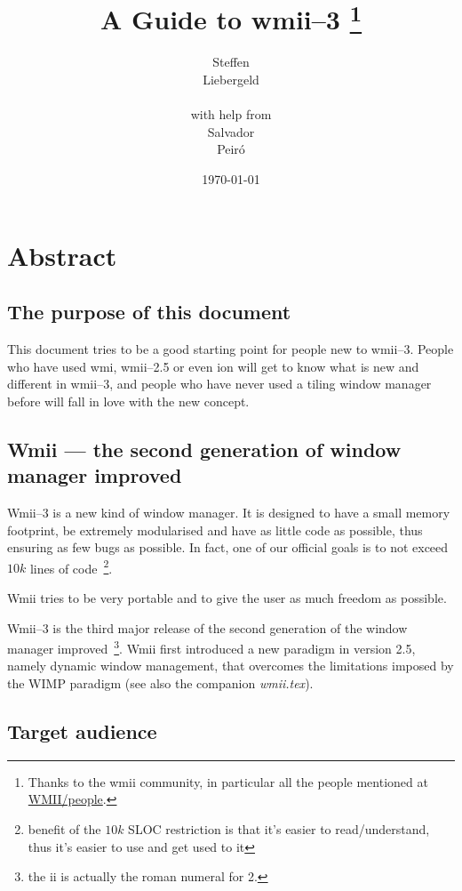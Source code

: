 \documentclass[12pt,a4paper]{article} %
\date{\today}
\author{
Steffen\\Liebergeld \\\\
\small{with help from}\\
Salvador\\Peir\'o
}
\title{A Guide to wmii--3%
\thanks{Thanks to the wmii community, in particular all the 
people mentioned at \href{http://wmii.de/index.php/WMII/People}{WMII/people}.}
}
\begin{document}
\maketitle

\tableofcontents

\newpage

\section{Abstract}

  \subsection{The purpose of this document}

    This document tries to be a good starting point for people new to
    wmii--3.  People who have used wmi, wmii--2.5 or even ion will get
    to know what is new and different in wmii--3, and people who have
    never used a tiling window manager before will fall in love with
    the new concept.
  
  \subsection{Wmii --- the second generation of window manager improved}

    Wmii--3 is a new kind of window manager. It is designed to have a
    small memory footprint, be extremely modularised and have as
    little code as possible, thus ensuring as few bugs as possible. In
    fact, one of our official goals is to not exceed $10 k$ lines of
    code~\footnote{ benefit of the $10 k$ SLOC restriction is that
    it's easier to read/understand, thus it's easier to use and get
    used to it}.

    Wmii tries to be very portable and to give the user as much
    freedom as possible.

    Wmii--3 is the third major release of the second generation of the
    window manager improved~\footnote{ the ii is actually the roman
    numeral for 2.}.  Wmii first introduced a new paradigm in version
    2.5, namely dynamic window management, that overcomes the
    limitations imposed by the WIMP paradigm (see also the companion
    \emph{wmii.tex}).
  
  \subsection{Target audience}
\end{document}
